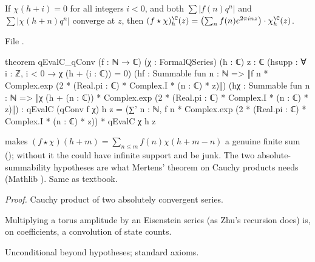 \begin{theorem}\label{l14:thm:qconv}
If $\chi(h+i) = 0$ for all integers $i<0$, and both $\sum|f(n)q^n|$ and $\sum|\chi(h+n)q^n|$ converge at $z$, then
$(f\star\chi)^{\C}_h(z) = \bigl(\sum_nf(n)e^{2\pi inz}\bigr)\cdot\chi^{\C}_h(z)$.
\end{theorem}
\noindent File .
\begin{leancode}
theorem qEvalC_qConv (f : ℕ → ℂ) (χ : FormalQSeries) (h : ℂ) {z : ℂ}
    (hsupp : ∀ i : ℤ, i < 0 → χ (h + (i : ℂ)) = 0)
    (hf : Summable fun n : ℕ => ‖f n * Complex.exp (2 * (Real.pi : ℂ) * Complex.I * (n : ℂ) * z)‖)
    (hχ : Summable fun n : ℕ =>
      ‖χ (h + (n : ℂ)) * Complex.exp (2 * (Real.pi : ℂ) * Complex.I * (n : ℂ) * z)‖) :
    qEvalC (qConv f χ) h z
      = (∑' n : ℕ, f n * Complex.exp (2 * (Real.pi : ℂ) * Complex.I * (n : ℂ) * z))
          * qEvalC χ h z
\end{leancode}
\begin{dictionary}
 makes $(f\star\chi)(h+m) = \sum_{n\le m}f(n)\chi(h+m-n)$ a genuine finite sum ();
without it the  could have infinite support and be junk. The two absolute-summability hypotheses are what
Mertens' theorem on Cauchy products needs (Mathlib ). Same as textbook.
\end{dictionary}
\noindent\emph{Proof.} Cauchy product of two absolutely convergent series.
\begin{physics}
Multiplying a torus amplitude by an Eisenstein series (as Zhu's recursion does) is, on coefficients, a convolution of state
counts.
\end{physics}
\begin{status}
Unconditional beyond hypotheses; standard axioms.
\end{status}

